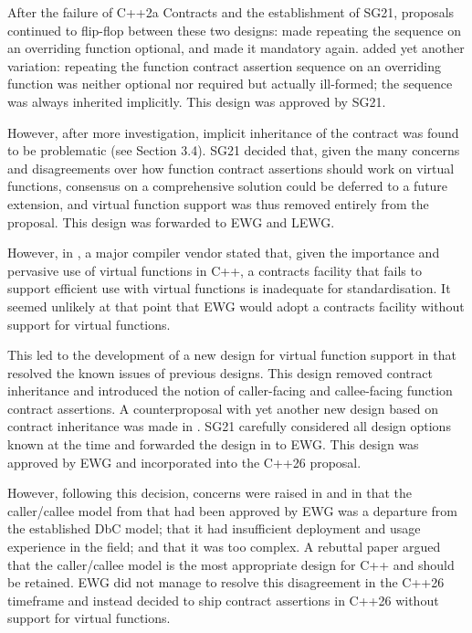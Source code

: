 After the failure of C++2a Contracts and the establishment of SG21, proposals continued to flip-flop between these two designs: \cite{P2388R4} made repeating the sequence on an overriding function optional, and \cite{P2521R5} made it mandatory again. \cite{P2954R0} added yet another variation: repeating the function contract assertion sequence on an overriding function was neither optional nor required but actually ill-formed; the sequence was always inherited implicitly. This design was approved by SG21.

However, after more investigation, implicit inheritance of the contract was found to be problematic (see \cite{P2932R3} Section 3.4). SG21 decided that, given the many concerns and disagreements over how function contract assertions should work on virtual functions, consensus on a comprehensive
solution could be deferred to a future extension, and virtual function support was thus removed
entirely from the proposal. This design was forwarded to EWG and LEWG.

However, in \cite{P3173R0}, a major compiler vendor stated that, given the importance and pervasive use of virtual functions in C++, a contracts facility that fails to support efficient use with virtual functions is inadequate for standardisation. It seemed unlikely at that point that EWG would adopt a contracts facility without support for virtual functions.

This led to the development of a new design for virtual function support in \cite{P3097R0} that resolved the known issues of previous designs. This design removed contract inheritance and introduced the notion of caller-facing and callee-facing function contract assertions. A counterproposal with yet another new design based on contract inheritance was made in \cite{P3169R0}. SG21 carefully considered all design options known at the time and forwarded the design in \cite{P3097R0} to EWG. This design was approved by EWG and incorporated into the C++26 proposal.

However, following this decision, concerns were raised in \cite{P3506R0} and in \cite{P3573R0} that the caller/callee model from \cite{P3097R0} that had been approved by EWG was a departure from the established DbC model; that it had insufficient deployment and usage experience in the field; and that it was too complex. A rebuttal paper \cite{P3506R0} argued that the caller/callee model is the most appropriate design for C++ and should be retained. EWG did not manage to resolve this disagreement in the C++26 timeframe and instead decided to ship contract assertions in C++26 without support for virtual functions.

